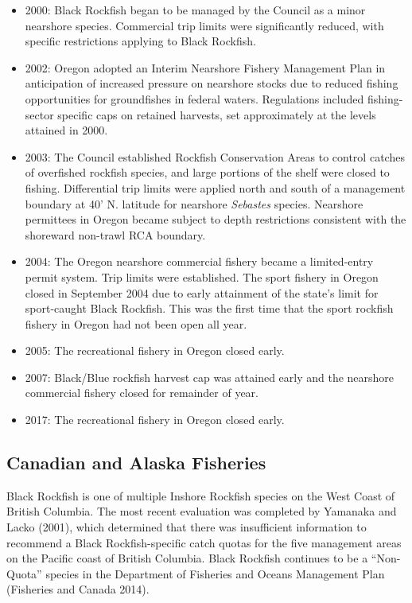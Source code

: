 \documentclass[11pt,
  english,
  letterpaper,
]{article}
\providecommand{\tightlist}{%
  \setlength{\itemsep}{0pt}\setlength{\parskip}{0pt}}
\providecommand{\tightlist}{%
  \setlength{\itemsep}{0pt}\setlength{\parskip}{0pt}}
\begin{document}
\begin{itemize}
\tightlist
\item
  2000: Black Rockfish began to be managed by the Council as a minor nearshore species. Commercial trip limits were significantly reduced, with specific restrictions applying to Black Rockfish.
\item
  2002: Oregon adopted an Interim Nearshore Fishery Management Plan in anticipation of increased pressure on nearshore stocks due to reduced fishing opportunities for groundfishes in federal waters. Regulations included fishing-sector specific caps on retained harvests, set approximately at the levels attained in 2000.
\item
  2003: The Council established Rockfish Conservation Areas to control catches of overfished rockfish species, and large portions of the shelf were closed to fishing. Differential trip limits were applied north and south of a management boundary at 40' N. latitude for nearshore \emph{Sebastes} species. Nearshore permittees in Oregon became subject to depth restrictions consistent with the shoreward non-trawl RCA boundary.
\item
  2004: The Oregon nearshore commercial fishery became a limited-entry permit system. Trip limits were established. The sport fishery in Oregon closed in September 2004 due to early attainment of the state's limit for sport-caught Black Rockfish. This was the first time that the sport rockfish fishery in Oregon had not been open all year.
\item
  2005: The recreational fishery in Oregon closed early.
\item
  2007: Black/Blue rockfish harvest cap was attained early and the nearshore commercial fishery closed for remainder of year.
\item
  2017: The recreational fishery in Oregon closed early.
\end{itemize}

\hypertarget{canadian-and-alaska-fisheries}{%
\subsection{Canadian and Alaska Fisheries}\label{canadian-and-alaska-fisheries}}

Black Rockfish is one of multiple Inshore Rockfish species on the West Coast of British Columbia. The most recent evaluation was completed by Yamanaka and Lacko (2001), which determined that there was insufficient information to recommend a Black Rockfish-specific catch quotas for the five management areas on the Pacific coast of British Columbia. Black Rockfish continues to be a ``Non-Quota'' species in the Department of Fisheries and Oceans Management Plan (Fisheries and Canada 2014).
\end{document}

